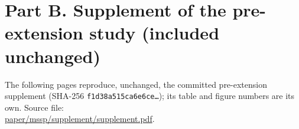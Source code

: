 \documentclass[10pt]{article}
\begin{document}
\clearpage
\section*{Part B. Supplement of the pre-extension study (included unchanged)}
\noindent The following pages reproduce, unchanged, the committed pre-extension supplement (SHA-256 \texttt{f1d38a515ca6e6ce\ldots}); its table and figure numbers are its own. Source file:\\ \url{paper/mssp/supplement/supplement.pdf}.

\end{document}
